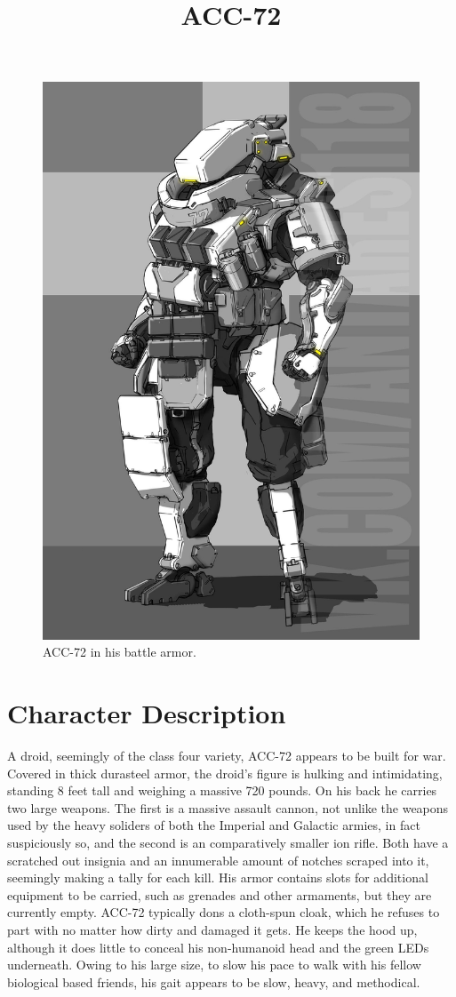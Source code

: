 \documentclass[12pt]{article}
\begin{document}
 
\title{ACC-72}
\date{}

\maketitle

\begin{figure}[!htb]
  \centering
  \includegraphics[width=.68\textwidth]{./resources/acc72}
  \caption{ACC-72 in his battle armor.}
\end{figure}

\section{Character Description}

A droid, seemingly of the class four variety, ACC-72 appears to be built for
war. 
Covered in thick durasteel armor, the droid's figure is hulking and
intimidating, standing 8 feet tall and weighing a massive 720 pounds. 
On his back he carries two large weapons. 
The first is a massive assault cannon, not unlike the weapons used by the heavy
soliders of both the Imperial and Galactic armies, in fact suspiciously so, and
the second is an comparatively smaller ion rifle. 
Both have a scratched out insignia and an innumerable amount of notches scraped
into it, seemingly making a tally for each kill. 
His armor contains slots for additional equipment to be carried, such as
grenades and other armaments, but they are currently empty. 
ACC-72 typically dons a cloth-spun cloak, which he refuses to part with no
matter how dirty and damaged it gets. 
He keeps the hood up, although it does little to conceal his non-humanoid head
and the green LEDs underneath. 
Owing to his large size, to slow his pace to walk with his fellow biological
based friends, his gait appears to be slow, heavy, and methodical. 
\end{document}
